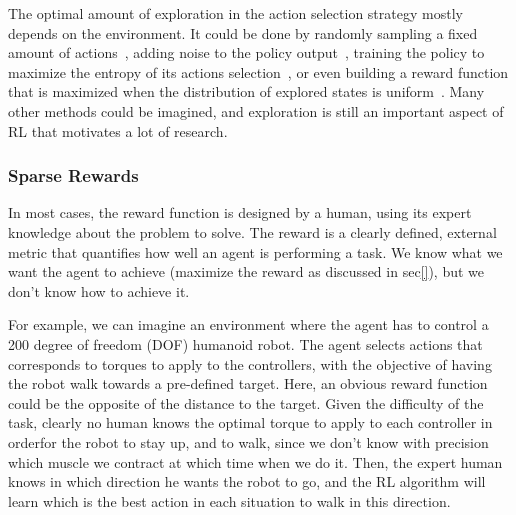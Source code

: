 The optimal amount of exploration in the action selection strategy mostly depends on the environment.
It could be done by randomly sampling a fixed amount of actions~\citep{mnih2013playing}, adding noise to the policy
output~\citep{lillicrap2015continuous}, training the policy to maximize the entropy of its actions
selection~\citep{haarnoja2018soft}, or even building a reward function that is maximized when the distribution of
explored states is uniform~\citep{pong2019skew}.
Many other methods could be imagined, and exploration is still an important aspect of RL that motivates a lot of research.

\subsubsection{Sparse Rewards}\label{subsubsection:bg:rl:prblems:sparse-rewards}

In most cases, the reward function is designed by a human, using its expert knowledge about the problem to solve.
The reward is a clearly defined, external metric that quantifies how well an agent is performing a task. We know what we want the agent to achieve (maximize the reward as discussed in sec\ref{}), but we don't know how to achieve it. 

For example, we can imagine an environment where the agent has to control a 200 degree of freedom (DOF) humanoid robot.
The agent selects actions that corresponds to torques to apply to the controllers, with the objective of having the robot walk
towards a pre-defined target.
Here, an obvious reward function could be the opposite of the distance to the target.
Given the difficulty of the task, clearly no human knows the optimal torque to apply to each controller in orderfor the robot to stay up, and to walk, since we
don't know with precision which muscle we contract at which time when we do it. %
Then, the expert human knows in which direction he wants the robot to go, and the RL algorithm will learn which is the
best action in each situation to walk in this direction.

